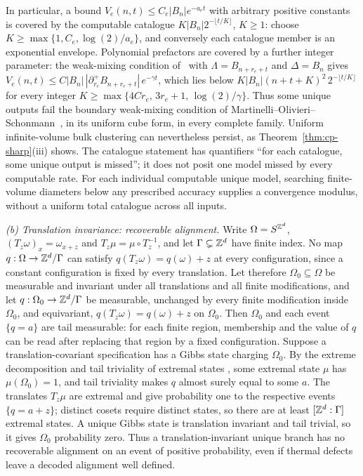 \begin{remark}
In particular, a bound $V_e(n,t)\le C_e|B_n|e^{-a_et}$ with arbitrary positive
constants is covered by the computable catalogue
$K|B_n|2^{-\lfloor t/K\rfloor}$, $K\ge1$: choose
$K\ge\max\{1,C_e,\log(2)/a_e\}$, and conversely each catalogue member is an
exponential envelope. Polynomial prefactors are covered by a further integer parameter: the weak-mixing condition of~\cite{MOS1994} with $\Lambda=B_{n+r_e+t}$ and $\Delta=B_n$ gives $V_e(n,t)\le C|B_n|\,|\partial^+_{r_e}B_{n+r_e+t}|\,e^{-\gamma t}$, which lies below $K|B_n|(n+t+K)^2\,2^{-\lfloor t/K\rfloor}$ for every integer $K\ge\max\{4Cr_e,\,3r_e+1,\,\log(2)/\gamma\}$. Thus some unique outputs fail the
boundary weak-mixing condition of Martinelli--Olivieri--Schonmann~\cite{MOS1994},
in its uniform cube form, in every complete family. Uniform infinite-volume
bulk clustering can nevertheless persist, as Theorem~\ref{thm:cp-sharp}(iii)
shows. The catalogue statement has quantifiers ``for each catalogue, some
unique output is missed''; it does not posit one model missed by every
computable rate. For each individual computable unique model, searching
finite-volume diameters below any prescribed accuracy supplies a convergence
modulus, without a uniform total catalogue across all inputs.

\emph{(b) Translation invariance: recoverable alignment.}
Write $\Omega=S^{\mathbb Z^d}$, $(T_z\omega)_x=\omega_{x+z}$ and $T_z\mu=\mu\circ T_z^{-1}$,
and let $\Gamma\subsetneq\mathbb Z^d$ have finite index. No map
$q:\Omega\to\mathbb Z^d/\Gamma$ can satisfy $q(T_z\omega)=q(\omega)+z$ at every
configuration, since a constant configuration is fixed by every translation.
Let therefore $\Omega_0\subseteq\Omega$ be measurable and invariant under all
translations and all finite modifications, and let $q:\Omega_0\to\mathbb Z^d/\Gamma$
be measurable, unchanged by every finite modification inside $\Omega_0$, and
equivariant, $q(T_z\omega)=q(\omega)+z$ on $\Omega_0$. Then $\Omega_0$ and each
event $\{q=a\}$ are tail measurable: for each finite region, membership and the
value of $q$ can be read after replacing that region by a fixed configuration.
Suppose a translation-covariant specification has a Gibbs state charging
$\Omega_0$. By the extreme decomposition and tail triviality of extremal states \cite[Theorems 7.26 and 7.7]{Georgii}, some
extremal state $\mu$ has $\mu(\Omega_0)=1$, and tail triviality makes $q$
almost surely equal to some $a$. The translates $T_z\mu$ are extremal and give
probability one to the respective events $\{q=a+z\}$; distinct cosets require
distinct states, so there are at least $[\mathbb Z^d:\Gamma]$ extremal states.
A unique Gibbs state is translation invariant and tail trivial, so it gives
$\Omega_0$ probability zero. Thus a translation-invariant unique branch has no
recoverable alignment on an event of positive probability, even if thermal
defects leave a decoded alignment well defined.


\end{remark}
